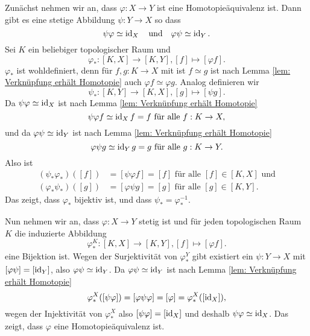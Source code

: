 \documentclass[a4paper,10pt]{article}
\begin{document}
Zunächst nehmen wir an, dass $\varphi : X \to Y$ ist eine Homotopieäquivalenz ist. Dann gibt es eine stetige Abbildung $\psi : Y \to X$ so dass
\[
 \psi \varphi \simeq \operatorname{id}_X \quad \text{und} \quad \varphi \psi \simeq \operatorname{id}_Y.
\]
Sei $K$ ein beliebiger topologischer Raum und
\[
 \varphi_* : [K,X] \to [K,Y], [f] \mapsto [\varphi f].
\]
$\varphi_*$ ist wohldefiniert, denn für $f,g : K \to X$ mit ist $f \simeq g$ ist nach Lemma \ref{lem: Verknüpfung erhält Homotopie} auch $\varphi f \simeq \varphi g$. Analog definieren wir
\[
 \psi_* : [K,Y] \to [K,X], [g] \mapsto [\psi g].
\]
Da $\psi \varphi \simeq \operatorname{id}_X$ ist nach Lemma \ref{lem: Verknüpfung erhält Homotopie}
\[
 \psi \varphi f \simeq \operatorname{id}_X f = f \text{ für alle } f : K \to X,
\]
und da $\varphi \psi \simeq \operatorname{id}_Y$ ist nach Lemma \ref{lem: Verknüpfung erhält Homotopie}
\[
 \varphi \psi g \simeq \operatorname{id}_Y g = g \text{ für alle } g : K \to Y.
\]
Also ist
\begin{align*}
 (\psi_* \varphi_*)([f]) &= [\psi \varphi f] = [f] \text{ für alle } [f] \in [K,X] \text{ und}\\
 (\varphi_* \psi_*)([g]) &= [\varphi \psi g] = [g] \text{ für alle } [g] \in [K,Y].
\end{align*}
Das zeigt, dass $\varphi_*$ bijektiv ist, und dass $\psi_* = \varphi_*^{-1}$.

Nun nehmen wir an, dass $\varphi : X \to Y$ stetig ist und für jeden topologischen Raum $K$ die induzierte Abbildung
\[
 \varphi^K_* : [K,X] \to [K,Y], [f] \mapsto [\varphi f].
\]
eine Bijektion ist. Wegen der Surjektivität von $\varphi_*^Y$ gibt existiert ein $\psi : Y \to X$ mit \mbox{$[\varphi \psi] = [\operatorname{id}_Y]$}, also $\varphi \psi \simeq \operatorname{id}_Y$. Da $\varphi \psi \simeq \operatorname{id}_Y$ ist nach Lemma \ref{lem: Verknüpfung erhält Homotopie}
\[
 \varphi_*^X([\psi \varphi]) = [\varphi \psi \varphi] = [\varphi] = \varphi_*^X([\operatorname{id}_X]),
\]
wegen der Injektivität von $\varphi_*^X$ also $[\psi \varphi] = [\operatorname{id}_X]$ und deshalb $\psi \varphi \simeq \operatorname{id}_X$. Das zeigt, dass $\varphi$ eine Homotopieäquivalenz ist.
\end{document}
